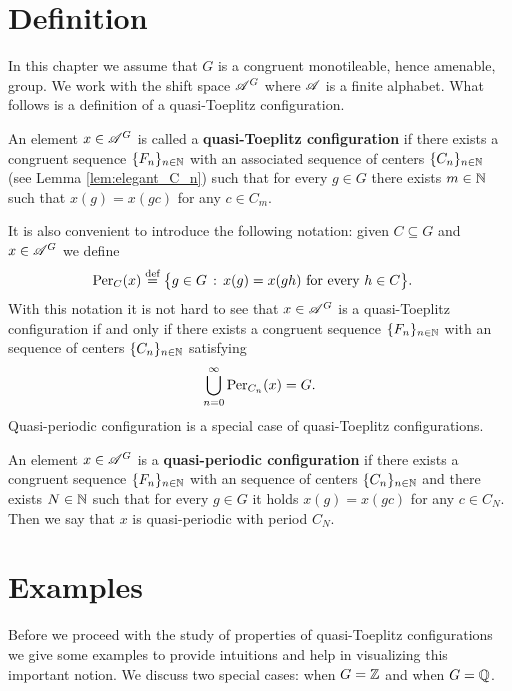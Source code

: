 \section{Definition}
In this chapter we assume that $G$ is a congruent monotileable, hence amenable, group. We work with the shift space $\mathscr{A}^G$ where $\mathscr{A}$ is a finite alphabet. What follows is a definition of a quasi-Toeplitz configuration.
\begin{defn}\label{def:toeplitz}
An element $x\in \mathscr{A}^G$ is called a {\bf quasi-Toeplitz configuration} if there exists a congruent \Folner sequence $\{F_n\}_{n\in\mathbb{N}}$ with an associated \elegant sequence of centers $\{C_n\}_{n\in\mathbb{N}}$ (see Lemma \ref{lem:elegant_C_n}) such that for every $g\in G$ there exists $m\in\mathbb{N}$ such that $ x(g)= x(gc)$ for any $c\in C_m$.
\end{defn}
\noindent
It is also convenient to introduce the following notation: given $C\subseteq G$ and $x\in\mathscr{A}^G$ we define
\begin{align*}
\text{Per}_{C}(x)&\stackrel{\textup{def}}{=}\big\{g\in G\,:\, x(g)=x(gh )\text{ for every }h\in C\big\}.
 \end{align*}
With this notation it is not hard to see that $x\in  \mathscr{A}^G$ is a quasi-Toeplitz configuration if and only if there exists a congruent \Folner  sequence $\{F_n\}_{n\in\mathbb{N}}$ with an \elegant sequence of centers $\{C_n\}_{n\in\mathbb{N}}$ satisfying
\[
\bigcup_{n=0}^{\infty}\operatorname{Per}_{C_n}(x)=G.
\]
Quasi-periodic configuration is a special case of quasi-Toeplitz configurations.
\begin{defn}
An element $x\in \mathscr{A}^G$ is a {\bf quasi-periodic configuration} if there exists a congruent \Folner sequence $\{F_n\}_{n\in\mathbb{N}}$ with an \elegant sequence of centers $\{C_n\}_{n\in\mathbb{N}}$ and there exists $N\in\mathbb{N}$ such that for every $g\in G$ it holds $ x(g)= x(gc)$ for any $c\in C_N$. Then we say that $x$ is quasi-periodic with period $C_N$.
\end{defn}


\section{Examples}
Before we proceed with the study of properties of quasi-Toeplitz configurations we give some examples to provide intuitions and help in visualizing this important notion.
%
We discuss two special cases: when $G=\mathbb{Z}$ and when $G=\mathbb{Q}$. 

